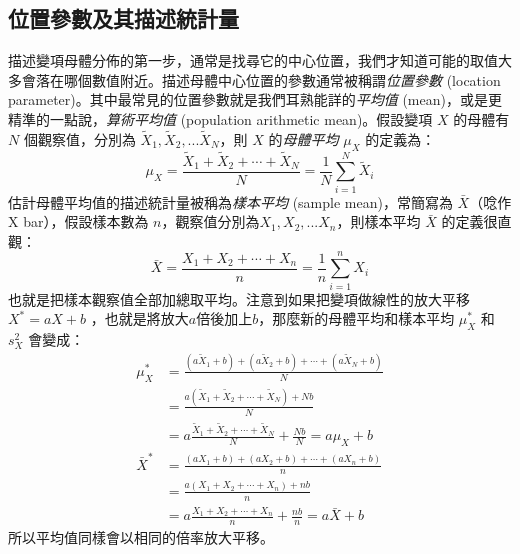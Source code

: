 \subsection{位置參數及其描述統計量}
    描述變項母體分佈的第一步，通常是找尋它的中心位置，我們才知道可能的取值大多會落在哪個數值附近。描述母體中心位置的參數通常被稱謂\textit{位置參數} (location parameter)。其中最常見的位置參數就是我們耳熟能詳的\textit{平均值} (mean)，或是更精準的一點說，\textit{算術平均值} (population arithmetic mean)。假設變項 $X$ 的母體有 $N$ 個觀察值，分別為 $\tilde{X}_1, \tilde{X}_2, ... \tilde{X}_N$，則 $X$ 的\textit{母體平均} $\mu_X$ 的定義為：
    \[\mu_X = \frac{\tilde{X}_1+\tilde{X}_2+\cdots+\tilde{X}_N}{N} = \frac{1}{N}\sum_{i=1}^N \tilde{X}_i\]
    估計母體平均值的描述統計量被稱為\textit{樣本平均} (sample mean)，常簡寫為 $\bar{X}$（唸作 X bar），假設樣本數為 $n$，觀察值分別為$X_1, X_2, ... X_n$，則樣本平均 $\bar{X}$ 的定義很直觀：
    \[\bar{X} = \frac{X_1+X_2+\cdots+X_n}{n} = \frac{1}{n}\sum_{i=1}^n X_i\]
    也就是把樣本觀察值全部加總取平均。注意到如果把變項做線性的放大平移 $X^* = aX+b$ ，也就是將放大$a$倍後加上$b$，那麼新的母體平均和樣本平均 $\mu_X^*$ 和 $s_X^2$ 會變成：
    \begin{align*}
        \mu_X^* &= \frac{(a\tilde{X}_1+b)+(a\tilde{X}_2+b)+\cdots+(a\tilde{X}_N+b)}{N}\\
        &= \frac{a(\tilde{X}_1+\tilde{X}_2+\cdots+\tilde{X}_N)+Nb}{N}\\
        &= a\frac{\tilde{X}_1+\tilde{X}_2+\cdots+\tilde{X}_N}{N} + \frac{Nb}{N} = a\mu_X + b\\
        \bar{X}^* &= \frac{(aX_1+b)+(aX_2+b)+\cdots+(aX_n+b)}{n}\\
        &= \frac{a(X_1+X_2+\cdots+X_n)+nb}{n}\\
        &= a\frac{X_1+X_2+\cdots+X_n}{n}+\frac{nb}{n}=a\bar{X}+b
    \end{align*}
    所以平均值同樣會以相同的倍率放大平移。
    
